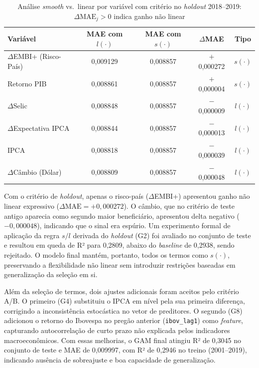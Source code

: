 \documentclass[	12pt, Times, openright, oneside, a4paper, english, brazil]{abntex2}
\begin{document}
\begin{table}[ht!]
\centering
\begin{tabular}{|l|c|c|c|c|}
\hline
\textbf{Variável} & \textbf{MAE com $l(\cdot)$} & \textbf{MAE com $s(\cdot)$} & \textbf{$\Delta$MAE} & \textbf{Tipo} \\ \hline
$\Delta$EMBI+ (Risco-País)   & 0{,}009129 & 0{,}008857 & $+$0{,}000272 & $s(\cdot)$ \\ \hline
Retorno PIB                  & 0{,}008861 & 0{,}008857 & $+$0{,}000004 & $s(\cdot)$ \\ \hline
$\Delta$Selic                & 0{,}008848 & 0{,}008857 & $-$0{,}000009 & $l(\cdot)$ \\ \hline
$\Delta$Expectativa IPCA     & 0{,}008844 & 0{,}008857 & $-$0{,}000013 & $l(\cdot)$ \\ \hline
IPCA                         & 0{,}008818 & 0{,}008857 & $-$0{,}000039 & $l(\cdot)$ \\ \hline
$\Delta$Câmbio (Dólar)       & 0{,}008809 & 0{,}008857 & $-$0{,}000048 & $l(\cdot)$ \\ \hline
\end{tabular}
\caption{Análise \textit{smooth} vs.\ linear por variável com critério no \textit{holdout} 2018--2019: $\Delta\text{MAE}_j > 0$ indica ganho não linear}\label{tab:gam_termos}
\end{table}

Com o critério de \textit{holdout}, apenas o risco-país ($\Delta$EMBI+) apresentou ganho não linear expressivo ($\Delta\text{MAE} = +0{,}000272$). O câmbio, que no critério de teste antigo aparecia como segundo maior beneficiário, apresentou delta negativo ($-0{,}000048$), indicando que o sinal era espúrio. Um experimento formal de aplicação da regra $s/l$ derivada do \textit{holdout} (G2) foi avaliado no conjunto de teste e resultou em queda de R² para 0{,}2809, abaixo do \textit{baseline} de 0{,}2938, sendo rejeitado. O modelo final mantém, portanto, todos os termos como $s(\cdot)$, preservando a flexibilidade não linear sem introduzir restrições baseadas em generalização da seleção em si.

Além da seleção de termos, dois ajustes adicionais foram aceitos pelo critério A/B. O primeiro (G4) substituiu o IPCA em nível pela sua primeira diferença, corrigindo a inconsistência estocástica no vetor de preditores. O segundo (G8) adicionou o retorno do Ibovespa no pregão anterior (\texttt{ibov\_lag1}) como \textit{feature}, capturando autocorrelação de curto prazo não explicada pelos indicadores macroeconômicos. Com essas melhorias, o GAM final atingiu R² de 0{,}3045 no conjunto de teste e MAE de 0{,}009997, com R² de 0{,}2946 no treino (2001--2019), indicando ausência de sobreajuste e boa capacidade de generalização.
\end{document}
